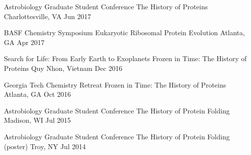 

\begin{cventries}

  \cventry
    {Astrobiology Graduate Student Conference} %
    {The History of Proteins} %
    {Charlottesville, VA} %
    {Jun 2017} %
    {}
    \vspace{-2.0mm}

  \cventry
    {BASF Chemistry Symposium} %
    {Eukaryotic Ribosomal Protein Evolution} %
    {Atlanta, GA} %
    {Apr 2017} %
    {}
    \vspace{-2.0mm}

  \cventry
    {Search for Life: From Early Earth to Exoplanets} %
    {Frozen in Time: The History of Proteins} %
    {Quy Nhon, Vietnam} %
    {Dec 2016} %
    {}
    \vspace{-2.0mm}

  \cventry
    {Georgia Tech Chemistry Retreat} %
    {Frozen in Time: The History of Proteins} %
    {Atlanta, GA} %
    {Oct 2016} %
    {}
    \vspace{-2.0mm}

  \cventry
    {Astrobiology Graduate Student Conference} %
    {The History of Protein Folding} %
    {Madison, WI} %
    {Jul 2015} %
    {}
    \vspace{-2.0mm}

  \cventry
    {Astrobiology Graduate Student Conference} %
    {The History of Protein Folding \scriptsize{(poster)}} %
    {Troy, NY} %
    {Jul 2014} %
    {}
    \vspace{-2.0mm}

\end{cventries}
